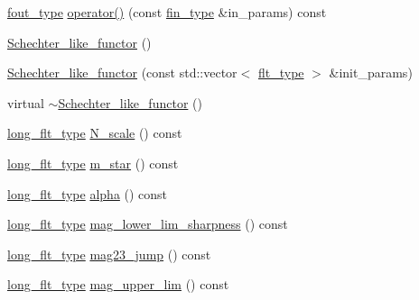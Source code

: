 \begin{DoxyCompactItemize}
\item 
\hyperlink{classIceBRG_1_1Schechter__like__functor_a90c760c2efcd3ae2b3a7f733672b18ed}{fout\+\_\+type} \hyperlink{classIceBRG_1_1Schechter__like__functor_af58cca1d9091086949437f9c07e1f8f9}{operator()} (const \hyperlink{classIceBRG_1_1Schechter__like__functor_aa444797b63bb4d4b01859b9c6a5d528e}{fin\+\_\+type} \&in\+\_\+params) const 
\item 
\hyperlink{classIceBRG_1_1Schechter__like__functor_a98942cf327953bc6de8cdd53fde65ef7}{Schechter\+\_\+like\+\_\+functor} ()
\item 
\hyperlink{classIceBRG_1_1Schechter__like__functor_a7541884f43f2cf37783e2abb84dc6347}{Schechter\+\_\+like\+\_\+functor} (const std\+::vector$<$ \hyperlink{lib_2IceBRG__main_2common_8h_ad0f130a56eeb944d9ef2692ee881ecc4}{flt\+\_\+type} $>$ \&init\+\_\+params)
\item 
virtual \hyperlink{classIceBRG_1_1Schechter__like__functor_aaf1a25297a4e050deab517c7e1edebfb}{$\sim$\+Schechter\+\_\+like\+\_\+functor} ()
\item 
\hyperlink{lib_2IceBRG__main_2common_8h_a7040956e7e1b504d34a9ccfb4253bdce}{long\+\_\+flt\+\_\+type} \hyperlink{classIceBRG_1_1Schechter__like__functor_a1d3bc3f012974c5e771113c611dfc8a8}{N\+\_\+scale} () const 
\item 
\hyperlink{lib_2IceBRG__main_2common_8h_a7040956e7e1b504d34a9ccfb4253bdce}{long\+\_\+flt\+\_\+type} \hyperlink{classIceBRG_1_1Schechter__like__functor_a2166028d7e17a3a97a397e8b95cda94f}{m\+\_\+star} () const 
\item 
\hyperlink{lib_2IceBRG__main_2common_8h_a7040956e7e1b504d34a9ccfb4253bdce}{long\+\_\+flt\+\_\+type} \hyperlink{classIceBRG_1_1Schechter__like__functor_a7f576357e46eed8edcf30e7950ebaaac}{alpha} () const 
\item 
\hyperlink{lib_2IceBRG__main_2common_8h_a7040956e7e1b504d34a9ccfb4253bdce}{long\+\_\+flt\+\_\+type} \hyperlink{classIceBRG_1_1Schechter__like__functor_a61505822b606261f916582fe719f5208}{mag\+\_\+lower\+\_\+lim\+\_\+sharpness} () const 
\item 
\hyperlink{lib_2IceBRG__main_2common_8h_a7040956e7e1b504d34a9ccfb4253bdce}{long\+\_\+flt\+\_\+type} \hyperlink{classIceBRG_1_1Schechter__like__functor_a562f01c56a7652050f5e501384ae7dbc}{mag23\+\_\+jump} () const 
\item 
\hyperlink{lib_2IceBRG__main_2common_8h_a7040956e7e1b504d34a9ccfb4253bdce}{long\+\_\+flt\+\_\+type} \hyperlink{classIceBRG_1_1Schechter__like__functor_adf075005214a553d0a7ed0b4ad112487}{mag\+\_\+upper\+\_\+lim} () const 

\end{DoxyCompactItemize}
